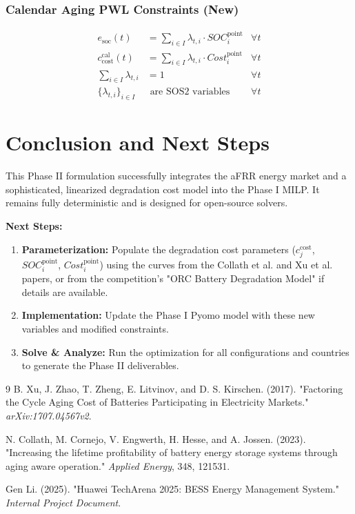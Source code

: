 \documentclass[11pt, a4paper]{article}
\begin{document}
\subsubsection{Calendar Aging PWL Constraints (New)}
\begin{align}
    e_{\mathrm{soc}}(t) &= \sum_{i \in I} \lambda_{t,i} \cdot SOC^{\mathrm{point}}_i & \forall t \\
    c^{\mathrm{cal}}_{\mathrm{cost}}(t) &= \sum_{i \in I} \lambda_{t,i} \cdot Cost^{\mathrm{point}}_i & \forall t \\
    \sum_{i \in I} \lambda_{t,i} &= 1 & \forall t \\
    \{\lambda_{t,i}\}_{i \in I} &\text{ are SOS2 variables} & \forall t
\end{align}

\section{Conclusion and Next Steps}
This Phase II formulation successfully integrates the aFRR energy market and a sophisticated, linearized degradation cost model into the Phase I MILP. It remains fully deterministic and is designed for open-source solvers.

\textbf{Next Steps:}
\begin{enumerate}
    \item \textbf{Parameterization:} Populate the degradation cost parameters ($c^{\mathrm{cost}}_{j}$, $SOC^{\mathrm{point}}_i$, $Cost^{\mathrm{point}}_i$) using the curves from the Collath et al. and Xu et al. papers, or from the competition's "ORC Battery Degradation Model" if details are available.
    \item \textbf{Implementation:} Update the Phase I Pyomo model with these new variables and modified constraints.
    \item \textbf{Solve \& Analyze:} Run the optimization for all configurations and countries to generate the Phase II deliverables.
\end{enumerate}

\begin{thebibliography}{9}
B. Xu, J. Zhao, T. Zheng, E. Litvinov, and D. S. Kirschen. (2017). "Factoring the Cycle Aging Cost of Batteries Participating in Electricity Markets." \textit{arXiv:1707.04567v2}.

N. Collath, M. Cornejo, V. Engwerth, H. Hesse, and A. Jossen. (2023). "Increasing the lifetime profitability of battery energy storage systems through aging aware operation." \textit{Applied Energy}, 348, 121531.

Gen Li. (2025). "Huawei TechArena 2025: BESS Energy Management System." \textit{Internal Project Document}.
\end{thebibliography}
\end{document}
